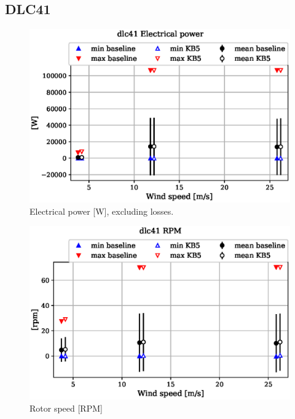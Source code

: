 
\subsection{DLC41}
\label{sec:baseline-vs-KB6:dlc41}

\begin{figure}[!ht]
\begin{center}
	\includegraphics[width=.85\linewidth]{figures/baseline-vs-KB6/dlc41/DLL-generator_servo-inpvec-2_AA0008_AA0008.eps}
\end{center}
\caption{Electrical power [W], excluding losses.}
\label{fig:baseline-vs-KB6:dlc41:power}
\end{figure}

\begin{figure}[!ht]
\begin{center}
	\includegraphics[width=.85\linewidth]{figures/baseline-vs-KB6/dlc41/bearing-shaft_rot-angle_speed-rpm_AA0008_AA0008.eps}
\end{center}
\caption{Rotor speed [RPM]}
\label{fig:baseline-vs-KB6:dlc41:rpm}
\end{figure}

